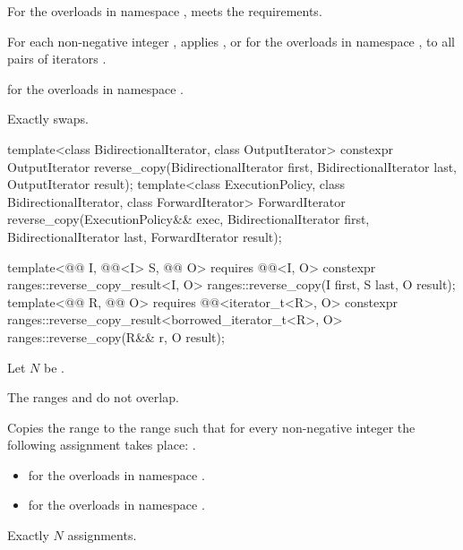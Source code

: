 \begin{itemdescr}
\pnum
\expects
For the overloads in namespace ,
 meets
the  requirements.

\pnum
\effects
For each non-negative integer ,
applies , or
 for the overloads in namespace ,
to all pairs of iterators .

\pnum
\returns
{} for the overloads in namespace .

\pnum
\complexity
Exactly  swaps.
\end{itemdescr}

%
\begin{itemdecl}
template<class BidirectionalIterator, class OutputIterator>
  constexpr OutputIterator
    reverse_copy(BidirectionalIterator first, BidirectionalIterator last,
                 OutputIterator result);
template<class ExecutionPolicy, class BidirectionalIterator, class ForwardIterator>
  ForwardIterator
    reverse_copy(ExecutionPolicy&& exec,
                 BidirectionalIterator first, BidirectionalIterator last,
                 ForwardIterator result);

template<@@ I, @@<I> S, @@ O>
  requires @@<I, O>
  constexpr ranges::reverse_copy_result<I, O>
    ranges::reverse_copy(I first, S last, O result);
template<@@ R, @@ O>
  requires @@<iterator_t<R>, O>
  constexpr ranges::reverse_copy_result<borrowed_iterator_t<R>, O>
    ranges::reverse_copy(R&& r, O result);
\end{itemdecl}

\begin{itemdescr}
\pnum
Let $N$ be .

\pnum
\expects
The ranges  and 
do not overlap.

\pnum
\effects
Copies the range  to the range 
such that for every non-negative integer 
the following assignment takes place:
.

\pnum
\returns
\begin{itemize}
\item
   for the overloads in namespace .
\item
   for the overloads in namespace .
\end{itemize}

\pnum
\complexity
Exactly $N$ assignments.
\end{itemdescr}

